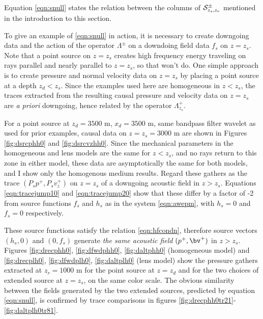 Equation \ref{eqn:snull} states the relation between the columns of $
{\cal S}^{\pm}_{z_s,z_r}$ mentioned in the introduction to this
section.

To give an example of \ref{eqn:snull} in action, it is necessary to
create downgoing data and the action of the operator $\Lambda^{\pm}$
on a downdoing field data $f_s$ on $z=z_s$. Note that a point source
on $z=z_s$ creates high frequency energy traveling on rays parallel
and nearly parallel to $z=z_s$, so that won't do. One simple approach
is to create pressure and normal velocity data on $z=z_s$ by placing a
point source at a depth $z_d<z_s$. Since the examples used here are
homogeneous in $z<z_s$, the traces extracted from the resulting
causal pressure and velocity data on $z=z_s$ are {\em a priori}
downgoing, hence related by the operator $\Lambda^+_{z_s}$.

For a point source at $z_d=3500$ m, $x_d=3500$ m, same bandpass filter
wavelet as used for prior examples, causal data on $z=z_s=3000$ m are
shown in Figures \ref{fig:dsrcphh0} and \ref{fig:dsrcvzhh0}. Since the
mechanical parameters in the homogeneous and lens models are the same
for $z<z_s$, and no rays return to this zone in either model, these
data are asymptotically the same for both models, and I show only the
homogenous medium results. Regard these gathers as the trace
$(P_sp^+,P_sv^+_z)$ on $z=z_s$ of a downgoing acoustic field in $z>z_s$.
Equations \ref{eqn:tracejump10} and
\ref{eqn:tracejump20} show that these differ by a factor of -2 from
source functions $f_s$ and $h_s$ as in the system \ref{eqn:awepm},
with $h_s=0$ and $f_s=0$ respectively.

These source functions satisfy
the relation \ref{eqn:hfcondn}, therefore source vectors $(h_s,0)$ and
$(0, f_s)$ generate {\em the same acoustic field} $(p^+,\bv^+)$ in $z>z_s$. Figures
\ref{fig:drecphh0}, \ref{fig:dfwdphh0}, \ref{fig:daltphh0} (homogeneous model) and
\ref{fig:drecplh0}, \ref{fig:dfwdplh0}, \ref{fig:daltplh0} (lens model) show the pressure
gathers extracted at $z_r=1000$ m for the point source at $z=z_d$ and
for the two choices of extended source at $z=z_s$, on the same color
scale. The obvious similarity between the fields generated by the two
extended sources,
predicted by equation \ref{eqn:snull}, is confirmed by trace
comparisons in figures \ref{fig:drecphh0tr21}-\ref{fig:daltplh0tr81}.


